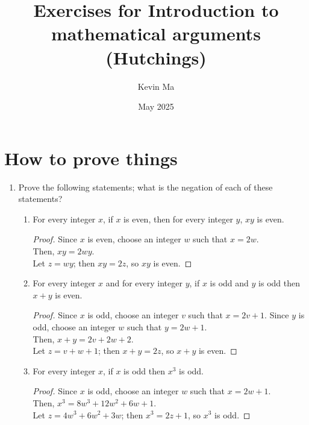 \documentclass{article}
\title{Exercises for Introduction to mathematical arguments (Hutchings)}
\author{Kevin Ma}
\date{May 2025}
\begin{document}
\maketitle

\setcounter{section}{1}

\section{How to prove things}

\begin{enumerate}
  \item Prove the following statements; what is the negation of each
    of these statements?
    \begin{enumerate}
      \item For every integer $x$, if $x$ is even, then for every
        integer $y$, $xy$ is even.

        \begin{proof}
          Since $x$ is even, choose an integer $w$ such that $x = 2w$. \\
          Then, $xy = 2wy$. \\
          Let $z=wy$; then $xy=2z$, so $xy$ is even.
        \end{proof}

      \item For every integer $x$ and for every integer $y$, if $x$
        is odd and $y$ is odd then $x + y$ is even.

        \begin{proof}
          Since $x$ is odd, choose an integer $v$ such that $x=2v+1$.
          Since $y$ is odd, choose an integer $w$ such that $y=2w+1$. \\
          Then, $x+y=2v+2w+2$. \\
          Let $z=v+w+1$; then $x+y=2z$, so $x+y$ is even.
        \end{proof}

      \item For every integer $x$, if $x$ is odd then $x^3$ is odd.

        \begin{proof}
          Since $x$ is odd, choose an integer $w$ such that $x=2w+1$. \\
          Then, $x^3 = 8w^3+12w^2+6w+1$. \\
          Let $z=4w^3+6w^2+3w$; then $x^3=2z+1$, so $x^3$ is odd.
        \end{proof}



\end{enumerate}
\end{enumerate}
\end{document}
